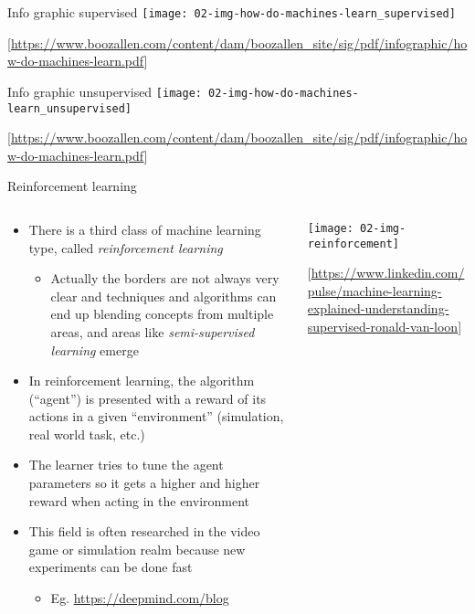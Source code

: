   \begin{frame}{Info graphic supervised}
      \texttt{[image: 02-img-how-do-machines-learn\_supervised]}
      \begin{center}
        \tiny[\url{https://www.boozallen.com/content/dam/boozallen_site/sig/pdf/infographic/how-do-machines-learn.pdf}]
      \end{center}
  \end{frame}

  \begin{frame}{Info graphic unsupervised}
      \texttt{[image: 02-img-how-do-machines-learn\_unsupervised]}
      \begin{center}
        \tiny[\url{https://www.boozallen.com/content/dam/boozallen_site/sig/pdf/infographic/how-do-machines-learn.pdf}]
      \end{center}
  \end{frame}

  \begin{frame}{Reinforcement learning}
    \begin{columns}
      \begin{column}{0.5\textwidth}
        \begin{itemize}
          \item There is a third class of machine learning type, called \emph{reinforcement learning}
          \begin{itemize}
            \item Actually the borders are not always very clear and techniques and algorithms can end up blending concepts from multiple areas, and areas like \emph{semi-supervised learning} emerge
          \end{itemize}
          \item In reinforcement learning, the algorithm (\enquote{agent}) is presented with a reward of its actions in a given \enquote{environment} (simulation, real world task, etc.)
          \item The learner tries to tune the agent parameters so it gets a higher and higher reward when acting in the environment
          \item This field is often researched in the video game or simulation realm because new experiments can be done fast
          \begin{itemize}
            \item Eg. \url{https://deepmind.com/blog}
          \end{itemize}
        \end{itemize}
      \end{column}
      \begin{column}{0.5\textwidth}
        \texttt{[image: 02-img-reinforcement]}
        \begin{center}
          \tiny[\url{https://www.linkedin.com/pulse/machine-learning-explained-understanding-supervised-ronald-van-loon}]
        \end{center}
      \end{column}
    \end{columns}
  \end{frame}


